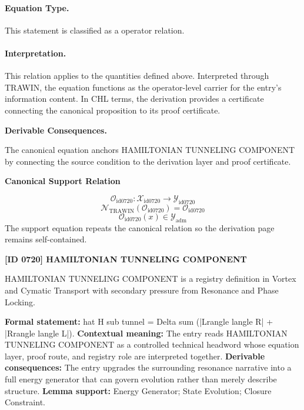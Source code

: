 \paragraph{Equation Type.}
This statement is classified as a operator relation.

\paragraph{Interpretation.}
This relation applies to the quantities defined above. Interpreted through TRAWIN, the equation functions as the operator-level carrier for the entry’s information content. In CHL terms, the derivation provides a certificate connecting the canonical proposition to its proof certificate.

\par\vspace{0.35em}
\noindent\textbf{Derivable Consequences.}\quad
\begingroup
\footnotesize
\raggedright
The canonical equation anchors HAMILTONIAN TUNNELING COMPONENT by connecting the source condition to the derivation layer and proof certificate.
\par\endgroup

\noindent\textbf{Canonical Support Relation}\par
\[
\mathcal{O}_{\mathrm{id0720}}:\mathcal{X}_{\mathrm{id0720}}\longrightarrow\mathcal{Y}_{\mathrm{id0720}}
\]
\[
\mathcal{N}_{\mathrm{TRAWIN}}(\mathcal{O}_{\mathrm{id0720}})=\mathcal{O}_{\mathrm{id0720}}
\]
\[
\mathcal{O}_{\mathrm{id0720}}(x)\in\mathcal{Y}_{\mathrm{adm}}
\]
\noindent The support equation repeats the canonical relation so the derivation page remains self-contained.\par

\clearpage
\noindent\textbf{[ID 0720] HAMILTONIAN TUNNELING COMPONENT}\par
\vspace{0.35em}
\begingroup\small
{}
HAMILTONIAN TUNNELING COMPONENT is a registry definition in Vortex and Cymatic Transport with secondary pressure from Resonance and Phase Locking.

\begingroup\footnotesize\setlength{\emergencystretch}{3em}\sloppy
\textbf{Formal statement:} hat H sub tunnel = Delta sum (|Lrangle langle R| + |Rrangle langle L|). \textbf{Contextual meaning:} The entry reads HAMILTONIAN TUNNELING COMPONENT as a controlled technical headword whose equation layer, proof route, and registry role are interpreted together. \textbf{Derivable consequences:} The entry upgrades the surrounding resonance narrative into a full energy generator that can govern evolution rather than merely describe structure. \textbf{Lemma support:} Energy Generator; State Evolution; Closure Constraint.\par
\endgroup

